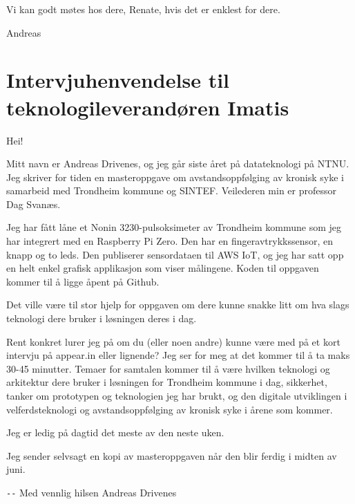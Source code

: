 Vi kan godt møtes hos dere, Renate, hvis det er enklest for dere.

Andreas

\section{Intervjuhenvendelse til teknologileverandøren Imatis}
Hei! 

Mitt navn er Andreas Drivenes, og jeg går siste året på datateknologi på NTNU. Jeg skriver for tiden en masteroppgave
om avstandsoppfølging av kronisk syke i samarbeid med Trondheim kommune og SINTEF. Veilederen min er professor Dag Svanæs.

Jeg har fått låne et Nonin 3230-pulsoksimeter av Trondheim kommune som jeg har integrert med en Raspberry Pi Zero.
Den har en fingeravtrykkssensor, en knapp og to leds. Den publiserer sensordataen til AWS IoT, og jeg har satt opp en helt
enkel grafisk applikasjon som viser målingene. Koden til oppgaven kommer til å ligge åpent på Github.

Det ville være til stor hjelp for oppgaven om dere kunne snakke litt om hva slags teknologi dere bruker i løsningen deres i dag.

Rent konkret lurer jeg på om du (eller noen andre) kunne være med på et kort intervju på appear.in eller lignende? 
Jeg ser for meg at det kommer til å ta maks 30-45 minutter. Temaer for samtalen kommer til å være hvilken teknologi og arkitektur
dere bruker i løsningen for Trondheim kommune i dag, sikkerhet, tanker om prototypen og teknologien jeg har brukt, og den
digitale utviklingen i velferdsteknologi og avstandsoppfølging av kronisk syke i årene som kommer.

Jeg er ledig på dagtid det meste av den neste uken.

Jeg sender selvsagt en kopi av masteroppgaven når den blir ferdig i midten av juni.

\verb|--| \newline
Med vennlig hilsen \newline
Andreas Drivenes \newline
